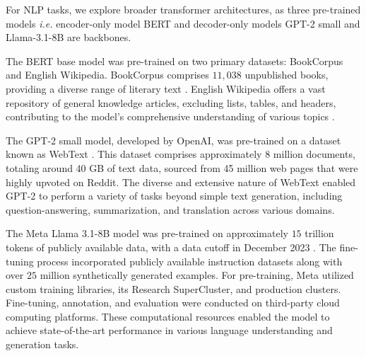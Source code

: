 \documentclass{article}
\theoremstyle{plain}
\theoremstyle{definition}
\theoremstyle{remark}
\begin{document}
For NLP tasks, we explore broader transformer architectures, as three pre-trained models \textit{i.e.} encoder-only model BERT \citep{devlin2018bert} and decoder-only models GPT-2 small \citep{radford2019language} and Llama-3.1-8B \citep{dubey2024llama, touvron2023llama} are backbones.

The BERT base model was pre-trained on two primary datasets: BookCorpus and English Wikipedia. BookCorpus comprises $11,038$ unpublished books, providing a diverse range of literary text \citep{zhu2015aligning}. English Wikipedia offers a vast repository of general knowledge articles, excluding lists, tables, and headers, contributing to the model's comprehensive understanding of various topics \citep{devlin2018bert}.

The GPT-2 small model, developed by OpenAI, was pre-trained on a dataset known as WebText \citep{radford2019language}. This dataset comprises approximately 8 million documents, totaling around 40 GB of text data, sourced from 45 million web pages that were highly upvoted on Reddit. The diverse and extensive nature of WebText enabled GPT-2 to perform a variety of tasks beyond simple text generation, including question-answering, summarization, and translation across various domains.

The Meta Llama 3.1-8B model was pre-trained on approximately $15$ trillion tokens of publicly available data, with a data cutoff in December 2023 \citep{dubey2024llama, touvron2023llama}. The fine-tuning process incorporated publicly available instruction datasets along with over $25$ million synthetically generated examples. For pre-training, Meta utilized custom training libraries, its Research SuperCluster, and production clusters. Fine-tuning, annotation, and evaluation were conducted on third-party cloud computing platforms. These computational resources enabled the model to achieve state-of-the-art performance in various language understanding and generation tasks.
\end{document}
